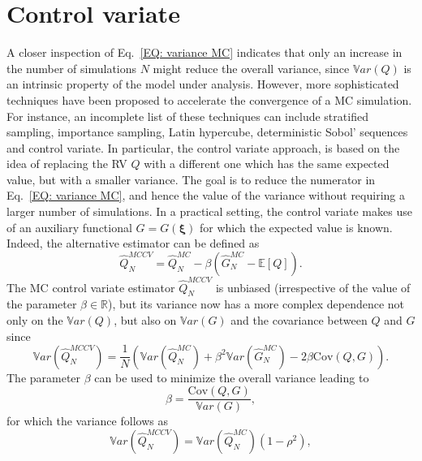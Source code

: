 \section{Control variate} \label{uq:sampling:montecarlo:controlvariate}
A closer inspection of Eq.~\ref{EQ: variance MC} indicates that only an increase in the number of simulations $N$ 
might reduce the overall variance, since $\mathbb{V}ar\left({Q}\right)$ is an intrinsic property of the model under analysis. However, 
more sophisticated  techniques have been proposed to accelerate the convergence of a MC simulation. For instance, an incomplete list 
of these techniques can include stratified sampling, importance sampling, Latin hypercube, deterministic Sobol' 
sequences and control variate. In particular, the control variate approach, is based on the idea of replacing
the RV $Q$ with a different one which has the same expected value, but with a smaller variance.
The goal is to reduce the numerator in Eq.~\ref{EQ: variance MC}, and hence the value of the variance without
requiring a larger number of simulations.
In a practical setting, the control variate makes use of an auxiliary functional $G=G(\boldsymbol{\xi})$ for which the 
expected value is known. Indeed, the alternative estimator can be defined as
\begin{equation} \label{EQ: control variate}
\hat{Q}_N^{MCCV} =  \hat{Q}_N^{MC} - \beta \left( \hat{G}_N^{MC} - \mathbb{E}\left[Q\right] \right).
\end{equation}
The MC control variate estimator $\hat{Q}_N^{MCCV}$ is unbiased (irrespective of the value of the parameter 
$\beta \in \mathbb{R}$), but its variance now has a more complex dependence not only 
on the $\mathbb{V}ar\left({Q}\right)$, but also on $\mathbb{V}ar\left(G\right)$ and the covariance between $Q$ and $G$ since
\begin{equation}
 \mathbb{V}ar\left(\hat{Q}_N^{MCCV}\right) = \dfrac{1}{N} \left( \mathbb{V}ar\left( \hat{Q}_N^{MC} \right) + \beta^2 \mathbb{V}ar\left( \hat{G}_N^{MC} \right) - 2\beta \mathrm{Cov}\left(Q,G\right) \right).
\end{equation}
The parameter $\beta$ can be used to minimize the overall variance leading to 
\begin{equation}
\beta = \dfrac{ \mathrm{Cov}\left(Q,G\right) }{ \mathbb{V}ar\left( G \right) }, 
\end{equation}
for which the variance follows as
\begin{equation}
 \mathbb{V}ar\left({\hat{Q}_N^{MCCV}}\right) = \mathbb{V}ar\left({\hat{Q}_N^{MC}}\right)\left( 1-\rho^2 \right),
\end{equation}
